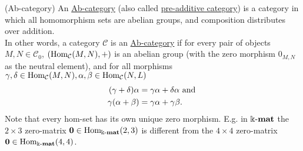 \begin{definition}{(Ab-category)}
An \ul{Ab-category} (also called \ul{pre-additive category}) is a category in which all homomorphism sets are abelian groups,
and composition distributes over addition.\\
In other words, a category $\mathcal{C}$ is an \ul{Ab-category} if for every pair of objects $M,N \in \mathcal{C}_{0}$,
$( \textup{Hom}_{\mathcal{C}}(M,N), + )$ is an abelian group (with the zero morphism $0_{M,N}$ as the neutral element),
and for all morphisms $\gamma, \delta \in \textup{Hom}_{\mathcal{C}}(M,N),
\alpha, \beta \in \textup{Hom}_{\mathcal{C}}(N,L)$
\begin{align}
(\gamma + \delta)\alpha &=\label{eq:dist1} \gamma\alpha + \delta\alpha \textup{ and }\\
\gamma(\alpha+\beta) &=\label{eq:dist2} \gamma\alpha + \gamma\beta.
\end{align}
Note that every hom-set has its own unique zero morphism. E.g. in $\Bbbk\textnormal{-}\mathbf{mat}$ the $2 \times 3$ zero-matrix
$\mathbf{0} \in \textup{Hom}_{\Bbbk\textnormal{-}\mathbf{mat}}(2,3)$ is different from the $4 \times 4$ zero-matrix $\mathbf{0} \in \textup{Hom}_{\Bbbk\textnormal{-}\mathbf{mat}}(4,4)$.
\end{definition}

